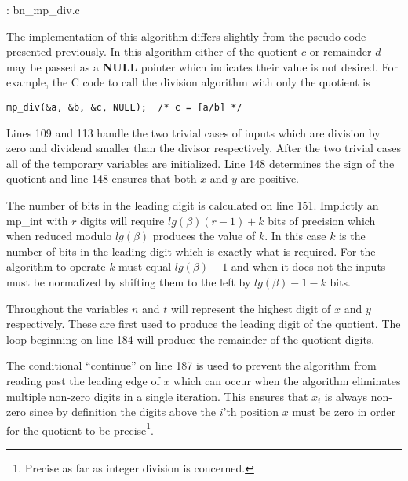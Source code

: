 \documentclass[b5paper]{book}
\begin{document}
\vspace{+3mm}\begin{small}
\hspace{-5.1mm}{\bf File}: bn\_mp\_div.c
\vspace{-3mm}
\begin{alltt}
\end{alltt}
\end{small}

The implementation of this algorithm differs slightly from the pseudo code presented previously.  In this algorithm either of the quotient $c$ or
remainder $d$ may be passed as a \textbf{NULL} pointer which indicates their value is not desired.  For example, the C code to call the division
algorithm with only the quotient is 

\begin{verbatim}
mp_div(&a, &b, &c, NULL);  /* c = [a/b] */
\end{verbatim}

Lines 109 and 113 handle the two trivial cases of inputs which are division by zero and dividend smaller than the divisor 
respectively.  After the two trivial cases all of the temporary variables are initialized.  Line 148 determines the sign of 
the quotient and line 148 ensures that both $x$ and $y$ are positive.  

The number of bits in the leading digit is calculated on line 151.  Implictly an mp\_int with $r$ digits will require $lg(\beta)(r-1) + k$ bits
of precision which when reduced modulo $lg(\beta)$ produces the value of $k$.  In this case $k$ is the number of bits in the leading digit which is
exactly what is required.  For the algorithm to operate $k$ must equal $lg(\beta) - 1$ and when it does not the inputs must be normalized by shifting
them to the left by $lg(\beta) - 1 - k$ bits.

Throughout the variables $n$ and $t$ will represent the highest digit of $x$ and $y$ respectively.  These are first used to produce the 
leading digit of the quotient.  The loop beginning on line 184 will produce the remainder of the quotient digits.

The conditional ``continue'' on line 187 is used to prevent the algorithm from reading past the leading edge of $x$ which can occur when the
algorithm eliminates multiple non-zero digits in a single iteration.  This ensures that $x_i$ is always non-zero since by definition the digits
above the $i$'th position $x$ must be zero in order for the quotient to be precise\footnote{Precise as far as integer division is concerned.}.  
\end{document}
